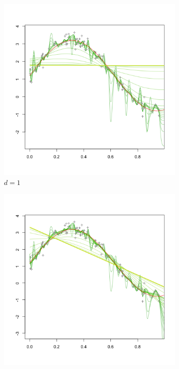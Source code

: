 \begin{figure}[H]
\begin{subfigure}{.5\textwidth}
  \includegraphics[scale=0.5]{PS_penalty_section_figure_6_order_1.png}
\caption{$d=1$}
\end{subfigure}
\begin{subfigure}{.5\textwidth}
  \centering
   \graphicspath{{img/}}
  \includegraphics[scale=0.5]{PS_penalty_section_figure_6_order_2.png}

\end{subfigure}
\end{figure}
